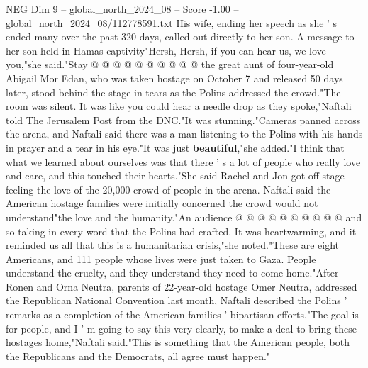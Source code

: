 \begin{textsample}{NEG Dim 9 – global\_north\_2024\_08 – Score -1.00 – global\_north\_2024\_08/112778591.txt}
His wife, ending her speech as she ' s ended many over the past 320 days, called out directly to her son.
A message to her son held in Hamas captivity"Hersh, Hersh, if you can hear us, we love you,"she said."Stay @ @ @ @ @ @ @ @ @ @ the great aunt of four-year-old Abigail Mor Edan, who was taken hostage on October 7 and released 50 days later, stood behind the stage in tears as the Polins addressed the crowd."The room was silent.
It was like you could hear a needle drop as they spoke,"Naftali told The Jerusalem Post from the DNC."It was stunning."Cameras panned across the arena, and Naftali said there was a man listening to the Polins with his hands in prayer and a tear in his eye."It was just \textbf{beautiful},"she added."I think that what we learned about ourselves was that there ' s a lot of people who really love and care, and this touched their hearts."She said Rachel and Jon got off stage feeling the love of the 20,000 crowd of people in the arena.
Naftali said the American hostage families were initially concerned the crowd would not understand"the love and the humanity."An audience @ @ @ @ @ @ @ @ @ @ and so taking in every word that the Polins had crafted.
It was heartwarming, and it reminded us all that this is a humanitarian crisis,"she noted."These are eight Americans, and 111 people whose lives were just taken to Gaza.
People understand the cruelty, and they understand they need to come home."After Ronen and Orna Neutra, parents of 22-year-old hostage Omer Neutra, addressed the Republican National Convention last month, Naftali described the Polins ' remarks as a completion of the American families ' bipartisan efforts."The goal is for people, and I ' m going to say this very clearly, to make a deal to bring these hostages home,"Naftali said."This is something that the American people, both the Republicans and the Democrats, all agree must happen."

\end{textsample}
